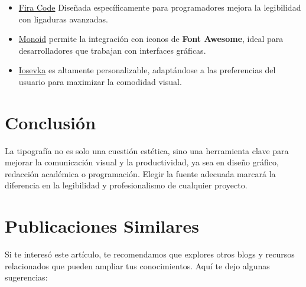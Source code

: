 \documentclass[
  jou,
  floatsintext,
  longtable,
  a4paper,
  nolmodern,
  notxfonts,
  notimes,
  colorlinks=true,linkcolor=blue,citecolor=blue,urlcolor=blue]{apa7}
\begin{document}
\begin{itemize}
\item
  \href{https://github.com/tonsky/FiraCode}{Fira Code} Diseñada
  específicamente para programadores mejora la legibilidad con ligaduras
  avanzadas.
\item
  \href{http://larsenwork.com/monoid/}{Monoid} permite la integración
  con iconos de \textbf{Font Awesome}, ideal para desarrolladores que
  trabajan con interfaces gráficas.
\item
  \href{https://be5invis.github.io/Iosevka/}{Iosevka} es altamente
  personalizable, adaptándose a las preferencias del usuario para
  maximizar la comodidad visual.
\end{itemize}

\section{Conclusión}\label{conclusiuxf3n}

La tipografía no es solo una cuestión estética, sino una herramienta
clave para mejorar la comunicación visual y la productividad, ya sea en
diseño gráfico, redacción académica o programación. Elegir la fuente
adecuada marcará la diferencia en la legibilidad y profesionalismo de
cualquier proyecto.

\section{Publicaciones Similares}\label{publicaciones-similares}

Si te interesó este artículo, te recomendamos que explores otros blogs y
recursos relacionados que pueden ampliar tus conocimientos. Aquí te dejo
algunas sugerencias:
\end{document}
